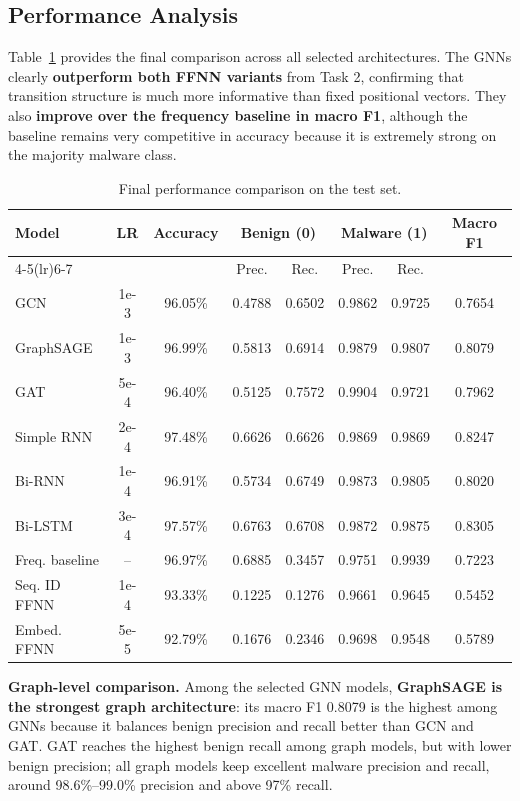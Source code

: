 \subsection{Performance Analysis} \label{subsec:task4_results}

Table~\ref{tab:task4_performance} provides the final comparison across all selected architectures. The GNNs clearly \textbf{outperform both FFNN variants} from Task 2, confirming that transition structure is much more informative than fixed positional vectors. They also \textbf{improve over the frequency baseline in macro F1}, although the baseline remains very competitive in accuracy because it is extremely strong on the majority malware class.

\begin{table}[H]
\footnotesize
\centering
\setlength{\tabcolsep}{3.5pt}
\renewcommand{\arraystretch}{0.95}
\caption{Final performance comparison on the test set.}
\label{tab:task4_performance}
\begin{tabular}{lccccccc}
\toprule
\textbf{Model} & \textbf{LR} & \textbf{Accuracy} & \multicolumn{2}{c}{\textbf{Benign (0)}} & \multicolumn{2}{c}{\textbf{Malware (1)}} & \textbf{Macro F1} \\
\cmidrule(lr){4-5}\cmidrule(lr){6-7}
 & & & Prec. & Rec. & Prec. & Rec. & \\
\midrule
GCN & 1e-3 & 96.05\% & 0.4788 & 0.6502 & 0.9862 & 0.9725 & 0.7654 \\
GraphSAGE & 1e-3 & 96.99\% & 0.5813 & 0.6914 & 0.9879 & 0.9807 & 0.8079 \\
GAT & 5e-4 & 96.40\% & 0.5125 & 0.7572 & 0.9904 & 0.9721 & 0.7962 \\
\midrule
Simple RNN & 2e-4 & 97.48\% & 0.6626 & 0.6626 & 0.9869 & 0.9869 & 0.8247 \\
Bi-RNN & 1e-4 & 96.91\% & 0.5734 & 0.6749 & 0.9873 & 0.9805 & 0.8020 \\
Bi-LSTM & 3e-4 & 97.57\% & 0.6763 & 0.6708 & 0.9872 & 0.9875 & 0.8305 \\
\midrule
Freq. baseline & -- & 96.97\% & 0.6885 & 0.3457 & 0.9751 & 0.9939 & 0.7223 \\
Seq. ID FFNN & 1e-4 & 93.33\% & 0.1225 & 0.1276 & 0.9661 & 0.9645 & 0.5452 \\
Embed. FFNN & 5e-5 & 92.79\% & 0.1676 & 0.2346 & 0.9698 & 0.9548 & 0.5789 \\
\bottomrule
\end{tabular}
\end{table}

\textbf{Graph-level comparison.} Among the selected GNN models, \textbf{GraphSAGE is the strongest graph architecture}: its macro F1 0.8079 is the highest among GNNs because it balances benign precision and recall better than GCN and GAT. GAT reaches the highest benign recall among graph models, but with lower benign precision; all graph models keep excellent malware precision and recall, around 98.6\%--99.0\% precision and above 97\% recall.

